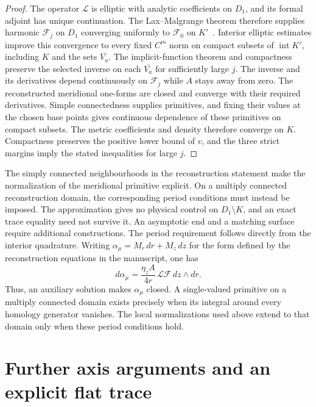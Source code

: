 \documentclass[11pt,a4paper]{article}
\numberwithin{equation}{section}
\theoremstyle{plain}
\theoremstyle{definition}
\theoremstyle{remark}
\begin{document}
\begin{proof}
The operator $\mathcal L$ is elliptic with analytic coefficients on
$D_1$, and its formal adjoint has unique continuation.
The Lax--Malgrange theorem therefore supplies harmonic
$\mathcal F_j$ on $D_1$ converging uniformly to $\mathcal F_0$ on
$K'$~\cite{Malgrange1956AIF}. Interior elliptic estimates improve
this convergence to every fixed $C^m$ norm on compact subsets of
$\operatorname{int}K'$, including $K$ and the sets
$\overline{V_a}$. The implicit-function theorem and compactness preserve the selected
inverse on each $\overline{V_a}$ for sufficiently large $j$.
The inverse and its derivatives depend continuously on
$\mathcal F_j$ while $A$ stays away from zero. The reconstructed
meridional one-forms are closed and converge with their required
derivatives. Simple connectedness supplies primitives, and fixing
their values at the chosen base points gives continuous dependence
of these primitives on compact subsets. The metric coefficients
and density therefore converge on $K$. Compactness preserves the
positive lower bound of $v$, and the three strict margins imply
the stated inequalities for large $j$.
\end{proof}
The simply connected neighbourhoods in the reconstruction statement
make the normalization of the meridional primitive explicit. On a
multiply connected reconstruction domain, the corresponding period
conditions must instead be imposed. The approximation gives no
physical control on $D_1\setminus K$, and an exact trace equality
need not survive it. An asymptotic end and a matching surface require
additional constructions. The period requirement follows directly from the interior quadrature. Writing $\alpha_\mu=M_r\,dr+M_z\,dz$ for the form defined by the reconstruction equations in the manuscript, one has
\begin{equation}\label{eq:interior-quadrature-compatibility}
d\alpha_\mu=\frac{\eta_z A}{4r}\,\mathcal L\mathcal F\,dz\wedge dr.
\end{equation}
Thus, an auxiliary solution makes $\alpha_\mu$ closed. A single-valued primitive on a multiply connected domain exists precisely when its integral around every homology generator vanishes. The local normalizations used above extend to that domain only when these period conditions hold.

\section{Further axis arguments and an explicit flat trace}
\label{sec:supplement-traces}
\end{document}
